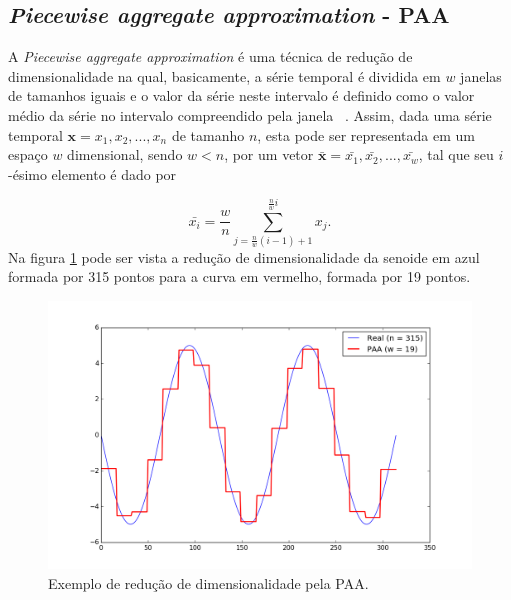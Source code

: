 \subsection{\emph{Piecewise aggregate approximation} - PAA}

A \emph{Piecewise aggregate approximation} é uma técnica de redução de dimensionalidade na qual, basicamente, a série temporal é dividida em $w$ janelas de tamanhos iguais e o valor da série neste intervalo é definido como o valor médio da série no intervalo compreendido pela janela ~\parencite{SAX}. Assim, dada uma série temporal $\bm{x} = x_1,x_2,...,x_n$ de tamanho $n$, esta pode ser representada em  um espaço $w$ dimensional, sendo $w<n$, por um vetor $\bm{\bar{x}} =\bar{x_1},\bar{x_2},...,\bar{x_w} $, tal que seu $i$-ésimo elemento é dado por

\begin{equation}
	\bar{x_i} = \frac{w}{n} \sum_{j=\frac{n}{w}(i-1)+1}^{\frac{n}{w}i} x_j.
\end{equation}
Na figura \ref{fig:PAA} pode ser vista a redução de dimensionalidade da senoide em azul formada por 315 pontos para a curva em vermelho, formada por 19 pontos.

\begin{figure}[h!]
	\includegraphics[width=\linewidth]{figuras/PAA.png}
	\caption{Exemplo de redução de dimensionalidade pela PAA.}
	\label{fig:PAA}
\end{figure}




